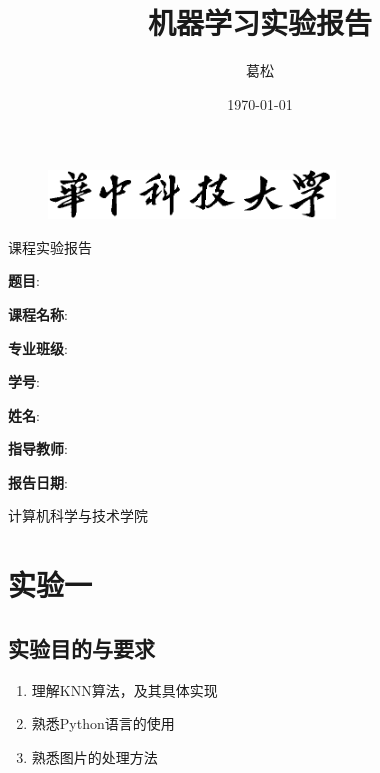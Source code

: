 \documentclass[UTF8]{ctexart}
\title{机器学习实验报告}
\author{葛松}
\date{\today}
\begin{document}
\thispagestyle{empty}
\begin{figure}[h]
    \centering
    \includegraphics[width=3in]{asset/华中科技大学.png}
\end{figure}

\begin{center}
    \fangsong
    课程实验报告
\end{center}



\vspace*{20mm}
\begin{center}
    \textbf{题目}:\underline{}
\end{center}

\vspace*{70mm}

\begin{center}
    \textbf{课程名称}: \underline{}
    
    \textbf{专业班级}: \underline{}

    \textbf{学\qquad 号}: \underline{}
    
    \textbf{姓\qquad 名}: \underline{}
    
    \textbf{指导教师}: \underline{}
    
    \textbf{报告日期}: \underline{\makebox[15em]{\today}}
\end{center}

\vspace*{50mm}

\begin{center}
    计算机科学与技术学院
\end{center}
\newpage
\thispagestyle{empty}
\tableofcontents
\newpage
\setcounter{page}{1}
\section{实验一}
\subsection{实验目的与要求}
\begin{enumerate}
    \item 理解KNN算法，及其具体实现
    \item 熟悉Python语言的使用
    \item 熟悉图片的处理方法
\end{enumerate}
\end{document}
